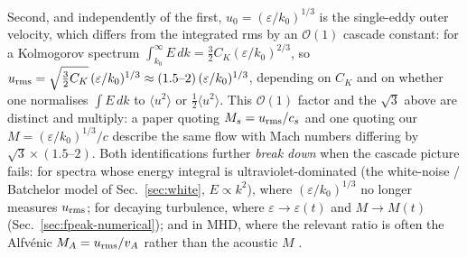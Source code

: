 \documentclass[10pt,prd,aps,nobibnotes,superscriptaddress,preprintnumbers,notitlepage]{revtex4-1}
\begin{document}
Second, and independently of the first, $u_0=(\varepsilon/k_0)^{1/3}$ is the
single-eddy outer velocity, which differs from the integrated rms by an
$\mathcal O(1)$ cascade constant: for a Kolmogorov spectrum
$\int_{k_0}^{\infty}\!E\,dk=\tfrac32 C_K(\varepsilon/k_0)^{2/3}$, so
$u_{\rm rms}=\sqrt{\tfrac32 C_K}\,(\varepsilon/k_0)^{1/3}\approx(1.5\text{--}2)\,
(\varepsilon/k_0)^{1/3}$, depending on $C_K$ and on whether one normalises
$\int E\,dk$ to $\langle u^2\rangle$ or $\tfrac12\langle u^2\rangle$. This
$\mathcal O(1)$ factor and the $\sqrt3$ above are distinct and multiply: a paper
quoting $M_s=u_{\rm rms}/c_s$ and one quoting our
$M=(\varepsilon/k_0)^{1/3}/c$ describe the same flow with Mach numbers differing
by $\sqrt3\times(1.5\text{--}2)$. Both identifications further \emph{break down}
when the cascade picture fails: for spectra whose energy integral is
ultraviolet-dominated (the white-noise / Batchelor model of
Sec.~\ref{sec:white}, $E\propto k^2$), where $(\varepsilon/k_0)^{1/3}$ no longer
measures $u_{\rm rms}$; for decaying turbulence, where
$\varepsilon\to\varepsilon(t)$ and $M\to M(t)$
(Sec.~\ref{sec:fpeak-numerical}); and in MHD, where the relevant ratio is often
the Alfv\'enic $M_A=u_{\rm rms}/v_A$ rather than the acoustic $M$
\cite{Kahniashvili:2008pe,Kahniashvili:2020jgm}.
\end{document}
